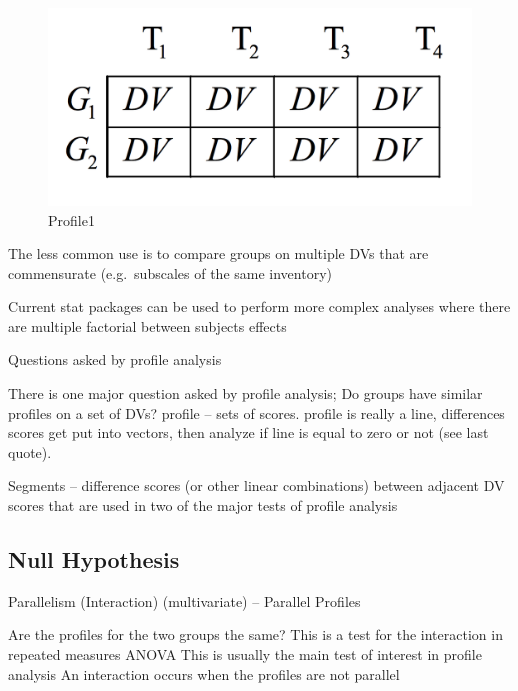 \documentclass[]{book}
\theoremstyle{definition}
\theoremstyle{definition}
\theoremstyle{definition}
\theoremstyle{remark}
\begin{document}
{\begin{figure}
\centering
\includegraphics{img/jhprofile1.png}
\caption{Profile1}
\end{figure}

The less common use is to compare groups on multiple DVs that are
commensurate (e.g.~subscales of the same inventory)

Current stat packages can be used to perform more complex analyses where
there are multiple factorial between subjects effects

Questions asked by profile analysis

There is one major question asked by profile analysis; Do groups have
similar profiles on a set of DVs? profile -- sets of scores. profile is
really a line, differences scores get put into vectors, then analyze if
line is equal to zero or not (see last quote).

Segments -- difference scores (or other linear combinations) between
adjacent DV scores that are used in two of the major tests of profile
analysis

\subsection{Null Hypothesis}\label{null-hypothesis}

Parallelism (Interaction) (multivariate) -- Parallel Profiles

Are the profiles for the two groups the same? This is a test for the
interaction in repeated measures ANOVA This is usually the main test of
interest in profile analysis An interaction occurs when the profiles are
not parallel

}
\end{document}
